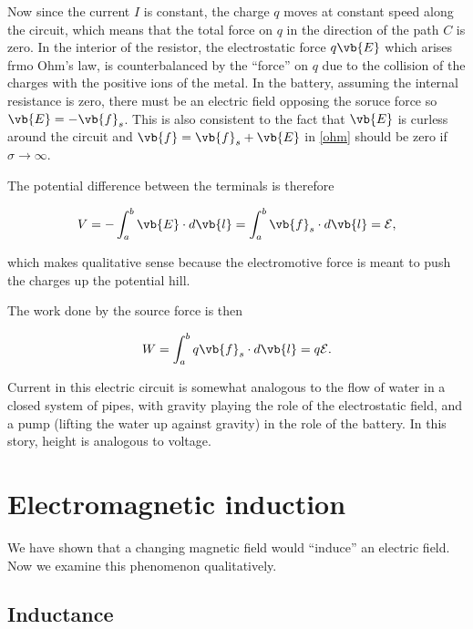 \documentclass[english,a4paper,12pt]{report}
\begin{document}
Now since the current \(I\) is constant, the charge \(q\) moves at constant speed along the circuit, which means that the total force on \(q\) in the direction of the path \(C\) is zero. In the interior of the resistor, the electrostatic force \( q\vb{E}  \) which arises frmo Ohm's law, is counterbalanced by the ``force'' on \(q\) due to the collision of the charges with the positive ions of the metal. In the battery, assuming the internal resistance is zero, there must be an electric field opposing the soruce force so \(\vb{E} = - \vb{f} _{s} \). This is also consistent to the fact that \(\vb{E} \) is curless around the circuit and \(\vb{f} = \vb{f} _{s} + \vb{E}  \) in \cref{ohm} should be zero if \(\sigma \rightarrow \infty\). 

The potential difference between the terminals is therefore 

\begin{equation}
    V = -\int_{a}^{b} \vb{E} \cdot d \vb{l} = \int_{a}^{b} \vb{f} _{s} \cdot d \vb{l} = \mathcal{E},
\end{equation}

which makes qualitative sense because the electromotive force is meant to push the charges up the potential hill.

The work done by the source force is then 

\begin{equation}
    W = \int_{a}^{b} q \vb{f} _{s} \cdot d \vb{l} = q \mathcal{E}.  
\end{equation}



Current in this electric circuit is somewhat analogous to the flow of water in a closed system of pipes, with gravity playing the role of the electrostatic field, and a pump (lifting the water up against gravity) in the role of the battery. In this story, height is analogous to voltage.

\chapter{Electromagnetic induction}

We have shown that a changing magnetic field would ``induce'' an electric field. Now we examine this phenomenon qualitatively.

\section{Inductance}
\end{document}
